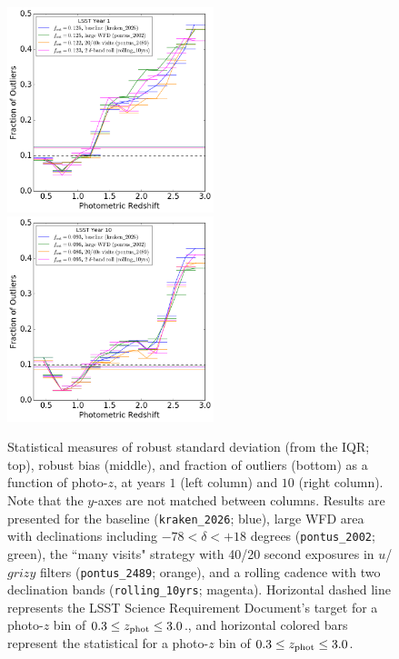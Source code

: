\begin{figure}
\begin{center}
\includegraphics[width=6cm,trim={0cm 0cm 0cm 0cm},clip]{figures/year1_fout.png}
\includegraphics[width=6cm,trim={0cm 0cm 0cm 0cm},clip]{figures/year10_fout.png}
\caption{Statistical measures of robust standard deviation (from the IQR; top), robust bias (middle), and fraction of outliers (bottom) as a function of photo-$z$, at years $1$ (left column) and $10$ (right column). Note that the $y$-axes are not matched between columns. Results are presented for the baseline ({\tt kraken\_2026}; blue), large WFD area with declinations including  $-78<\delta<+18$ degrees ({\tt pontus\_2002}; green), the ``many visits" strategy with 40/20 second exposures in $u$/$grizy$ filters ({\tt pontus\_2489}; orange), and a rolling cadence with two declination bands ({\tt rolling\_10yrs}; magenta). Horizontal dashed line represents the LSST Science Requirement Document's target for a photo-$z$ bin of $0.3 \leq z_{\rm phot} \leq 3.0$., and horizontal colored bars represent the statistical for a photo-$z$ bin of $0.3 \leq z_{\rm phot} \leq 3.0$. \label{fig:stats_opsim}}
\end{center}
\end{figure}

